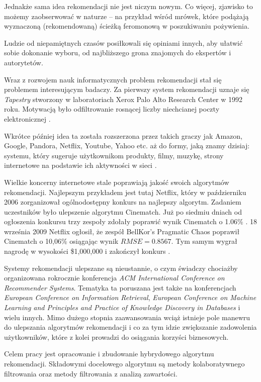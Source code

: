 \documentclass[twoside]{iisthesis}
\begin{document}
	 Jednakże sama idea rekomendacji nie jest niczym nowym. Co więcej, zjawisko to możemy zaobserwować w naturze -- na przykład wśród mrówek, które podążają wyznaczoną (rekomendowaną) ścieżką feromonową w poszukiwaniu pożywienia.
	 
	 Ludzie od niepamiętnych czasów posiłkowali się opiniami innych, aby ułatwić sobie dokonanie wyboru, od najbliższego grona znajomych do ekspertów i autorytetów.
	 
	 Wraz z rozwojem nauk informatycznych problem rekomendacji stał się problemem interesującym badaczy. Za pierwszy system rekomendacji uznaje się \textit{Tapestry} stworzony w laboratoriach Xerox Palo Alto Research Center w 1992 roku. Motywacją było odfiltrowanie rosnącej liczby niechcianej poczty elektronicznej \cite{id:FromTapestryToSVD}.
	 
	 Wkrótce później idea ta została rozszerzona przez takich graczy jak Amazon, Google, Pandora, Netflix, Youtube, Yahoo etc. aż do formy, jaką znamy dzisiaj: systemu, który sugeruje użytkownikom produkty, filmy, muzykę, strony internetowe na podstawie ich aktywności w sieci \cite{id:EvolutionOfRecommenderSystems}. 
	 
	 Wielkie koncerny internetowe stale poprawiają jakość swoich algorytmów rekomendacji. Najlepszym przykładem jest tutaj Netflix, który w październiku 2006 zorganizował ogólnodostępny konkurs na najlepszy algorytm. Zadaniem uczestników było ulepszenie algorytmu Cinematch. Już po siedmiu dniach od ogłoszenia konkursu trzy zespoły zdołały poprawić wynik Cinematch o 1.06\% \cite{id:NetflixPrize,id:NetflixPrizeRankings}. 18 września 2009 Netflix ogłosił, że zespół BellKor's Pragmatic Chaos poprawił Cinematch o 10,06\% osiągając wynik $RMSE = 0.8567$. Tym samym wygrał nagrodę w wysokości \$1,000,000 i zakończył konkurs \cite{id:NetflixPrize2,id:NetflixPrizeRules}.
	 
	 Systemy rekomendacji ulepszane są nieustannie, o czym świadczy chociażby organizowana rokrocznie konferencja\textit{ ACM International Conference on Recommender Systems}. Tematyka ta poruszana jest także na konferencjach \textit{European Conference on Information Retrieval}, \textit{European Conference on Machine Learning and Principles and Practice of Knowledge Discovery in Databases} i wielu innych. Mimo dużego stopnia zaawansowania wciąż istnieje pole manewru do ulepszania algorytmów rekomendacji i co za tym idzie zwiększanie zadowolenia użytkowników, które z kolei prowadzi do osiągania korzyści biznesowych.
	 
	 Celem pracy jest opracowanie i zbudowanie hybrydowego algorytmu rekomendacji. Składowymi docelowego algorytmu są metody kolaboratywnego filtrowania oraz metody filtrowania z analizą zawartości.  
	 
\end{document}
